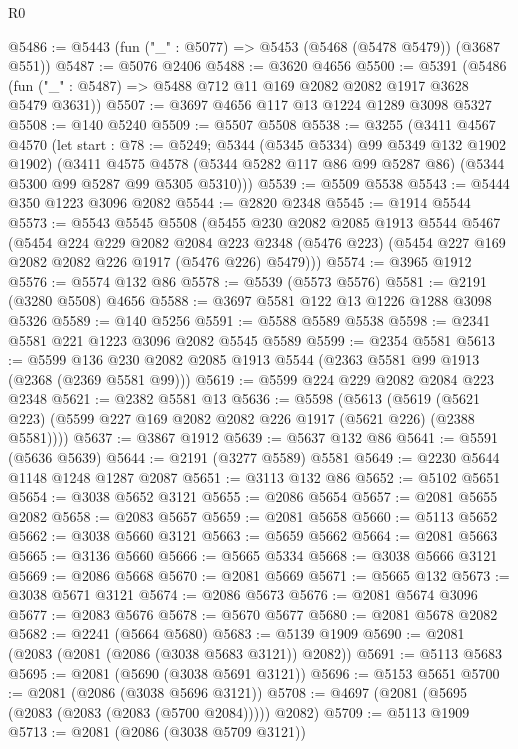 \begin{lexlean}{R0}
\begin{coremodule}
@5486 := @5443 (fun ("_" : @5077) => @5453 (@5468 (@5478 @5479)) (@3687 @551))
@5487 := @5076 @2406
@5488 := @3620 @4656
@5500 := @5391
    (@5486 (fun ("_" : @5487) => @5488 @712 @11 @169 @2082 @2082 @1917 @3628 @5479 @3631))
@5507 := @3697 @4656 @117 @13 @1224 @1289 @3098 @5327
@5508 := @140 @5240
@5509 := @5507 @5508
@5538 := @3255
    (@3411
      @4567
      @4570
      (let start : @78 := @5249; @5344 (@5345 @5334) @99 @5349 @132 @1902 @1902)
      (@3411
        @4575
        @4578
        (@5344 @5282 @117 @86 @99 @5287 @86)
        (@5344 @5300 @99 @5287 @99 @5305 @5310)))
@5539 := @5509 @5538
@5543 := @5444 @350 @1223 @3096 @2082
@5544 := @2820 @2348
@5545 := @1914 @5544
@5573 := @5543
    @5545
    @5508
    (@5455
      @230
      @2082
      @2085
      @1913
      @5544
      @5467
      (@5454
        @224
        @229
        @2082
        @2084
        @223
        @2348
        (@5476 @223)
        (@5454 @227 @169 @2082 @2082 @226 @1917 (@5476 @226) @5479)))
@5574 := @3965 @1912
@5576 := @5574 @132 @86
@5578 := @5539 (@5573 @5576)
@5581 := @2191 (@3280 @5508) @4656
@5588 := @3697 @5581 @122 @13 @1226 @1288 @3098 @5326
@5589 := @140 @5256
@5591 := @5588 @5589 @5538
@5598 := @2341 @5581 @221 @1223 @3096 @2082 @5545 @5589
@5599 := @2354 @5581
@5613 := @5599 @136 @230 @2082 @2085 @1913 @5544 (@2363 @5581 @99 @1913 (@2368 (@2369 @5581 @99)))
@5619 := @5599 @224 @229 @2082 @2084 @223 @2348
@5621 := @2382 @5581 @13
@5636 := @5598
    (@5613 (@5619 (@5621 @223) (@5599 @227 @169 @2082 @2082 @226 @1917 (@5621 @226) (@2388 @5581))))
@5637 := @3867 @1912
@5639 := @5637 @132 @86
@5641 := @5591 (@5636 @5639)
@5644 := @2191 (@3277 @5589) @5581
@5649 := @2230 @5644 @1148 @1248 @1287 @2087
@5651 := @3113 @132 @86
@5652 := @5102 @5651
@5654 := @3038 @5652 @3121
@5655 := @2086 @5654
@5657 := @2081 @5655 @2082
@5658 := @2083 @5657
@5659 := @2081 @5658
@5660 := @5113 @5652
@5662 := @3038 @5660 @3121
@5663 := @5659 @5662
@5664 := @2081 @5663
@5665 := @3136 @5660
@5666 := @5665 @5334
@5668 := @3038 @5666 @3121
@5669 := @2086 @5668
@5670 := @2081 @5669
@5671 := @5665 @132
@5673 := @3038 @5671 @3121
@5674 := @2086 @5673
@5676 := @2081 @5674 @3096
@5677 := @2083 @5676
@5678 := @5670 @5677
@5680 := @2081 @5678 @2082
@5682 := @2241 (@5664 @5680)
@5683 := @5139 @1909
@5690 := @2081 (@2083 (@2081 (@2086 (@3038 @5683 @3121)) @2082))
@5691 := @5113 @5683
@5695 := @2081 (@5690 (@3038 @5691 @3121))
@5696 := @5153 @5651
@5700 := @2081 (@2086 (@3038 @5696 @3121))
@5708 := @4697 (@2081 (@5695 (@2083 (@2083 (@2083 (@5700 @2084))))) @2082)
@5709 := @5113 @1909
@5713 := @2081 (@2086 (@3038 @5709 @3121))

\end{coremodule}
\end{lexlean}

